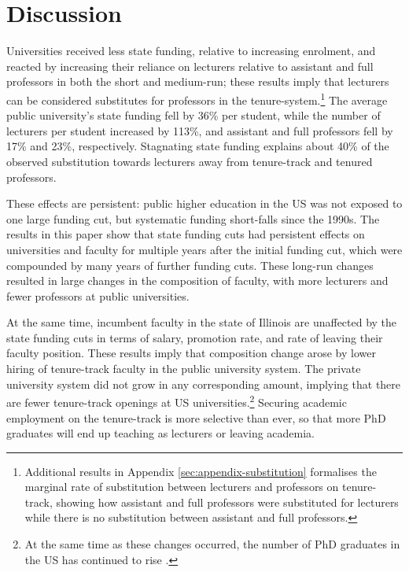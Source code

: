\section{Discussion}
\label{sec:discussion}

Universities received less state funding, relative to increasing enrolment, and reacted by increasing their reliance on lecturers relative to assistant and full professors in both the short and medium-run; these results imply that lecturers can be considered substitutes for professors in the tenure-system.\footnote{
    Additional results in Appendix \autoref{sec:appendix-substitution} formalises the marginal rate of substitution between lecturers and professors on tenure-track, showing how assistant and full professors were substituted for lecturers while there is no substitution between assistant and full professors.
}
The average public university's state funding fell by 36\% per student, while the number of lecturers per student increased by 113\%, and assistant and full professors  fell by 17\% and 23\%, respectively.
Stagnating state funding explains about 40\% of the observed substitution towards lecturers away from tenure-track and tenured professors.

These effects are persistent: public higher education in the US was not exposed to one large funding cut, but systematic funding short-falls since the 1990s.
The results in this paper show that state funding cuts had persistent effects on universities and faculty for multiple years after the initial funding cut, which were compounded by many years of further funding cuts.
These long-run changes resulted in large changes in the composition of faculty, with more lecturers and fewer professors at public universities.

At the same time, incumbent faculty in the state of Illinois are unaffected by the state funding cuts in terms of salary, promotion rate, and rate of leaving their faculty position.
These results imply that composition change arose by lower hiring of tenure-track faculty in the public university system.
The private university system did not grow in any corresponding amount, implying that there are fewer tenure-track openings at US universities.\footnote{
    At the same time as these changes occurred, the number of PhD graduates in the US has continued to rise \citep{aau2021survey,wapman2022quantifying}.
}
Securing academic employment on the tenure-track is more selective than ever, so that more PhD graduates will end up teaching as lecturers or leaving academia.

